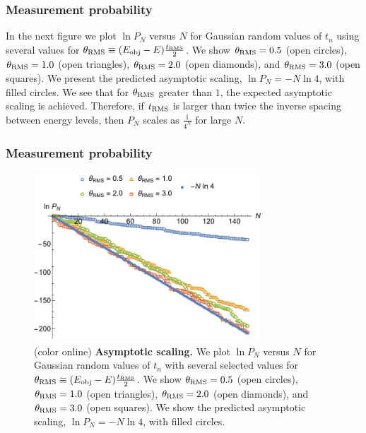 \documentclass{beamer}
\begin{document}
\begin{frame}
\frametitle{Measurement probability}
In the next figure  we plot $\ln P_N$ versus $N$ for Gaussian random values of $t_n$ using several values for $\theta_{\rm RMS}\equiv(E_{\rm obj}-E)\tfrac{t_{\rm RMS}}{2}$.  We show $\theta_{\rm RMS}=0.5$ (open circles), $\theta_{\rm RMS}=1.0$ (open triangles), $\theta_{\rm RMS}=2.0$ (open diamonds), and $\theta_{\rm RMS}=3.0$ (open squares). We present the predicted asymptotic scaling, $\ln P_N = -N \ln 4$, with filled circles.  We see that for $\theta_{\rm RMS}$ greater than $1$, the expected asymptotic scaling is achieved.  Therefore, if $t_{\rm RMS}$ is larger than twice the inverse spacing between energy levels, then $P_N$ scales as $\tfrac{1}{4^N}$ for large $N$.
\end{frame}


\begin{frame}
\frametitle{Measurement probability}
\begin{figure}
\centering
\includegraphics[width=8.5cm]{rodeofigs/Asymptotic.pdf}
\caption{(color online) {\bf Asymptotic scaling.} We plot $\ln P_N$ versus $N$ for Gaussian random values of $t_n$ with several selected values for $\theta_{\rm RMS}\equiv(E_{\rm obj}-E)\tfrac{t_{\rm RMS}}{2}$.  We show $\theta_{\rm RMS}=0.5$ (open circles), $\theta_{\rm RMS}=1.0$ (open triangles), $\theta_{\rm RMS}=2.0$ (open diamonds), and $\theta_{\rm RMS}=3.0$ (open squares). We show the predicted asymptotic scaling, $\ln P_N = -N \ln 4$, with filled circles.}
\label{asymptotic}
\end{figure} 

\end{frame}
\end{document}
